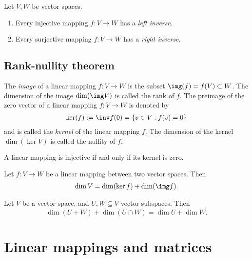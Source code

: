 \documentclass{article}
\begin{document}
\begin{proposition}[Notes 1.7.9]
    Let $V,W$ be vector spaces.
    \begin{enumerate}
        \item Every injective mapping $f:V\to W$ has a \emph{left inverse}.
        \item Every surjective mapping $f:V\to W$ has a \emph{right inverse}.
    \end{enumerate}
\end{proposition}

\subsection{Rank-nullity theorem}

\begin{definition}
    The \emph{image} of a linear mapping $f:V\to W$ is the subset $\img(f)=f(V)\subset W$.
    The dimension of the image $\dim(\img V)$ is called the rank of $f$.
    The preimage of the zero vector of a linear mapping $f:V\to W$ is denoted by
    \begin{align*}
        \ker(f):=\inv f(0)=\{v\in V : f(v)=0\}
    \end{align*}
    and is called the \emph{kernel} of the linear mapping $f$. The dimension of the
    kernel $\dim(\ker V)$ is called the nullity of $f$.
\end{definition}

\begin{lemma}[Notes 1.8.2]
    A linear mapping is injective if and only if its kernel is zero.
\end{lemma}

\begin{theorem}
    Let $f:V\to W$ be a linear mapping between two vector spaces. Then
    \begin{align*}
        \dim V = \dim(\ker f) + \dim(\img f).
    \end{align*}
\end{theorem}

\begin{corollary}
    Let $V$ be a vector space, and $U,W\subseteq V$ vector subspaces. Then
    \begin{align*}
        \dim(U+W)+\dim(U\cap W) = \dim U + \dim W.
    \end{align*}
\end{corollary}

\section{Linear mappings and matrices}
\end{document}
